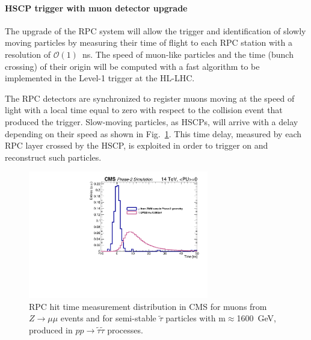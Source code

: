 \paragraph{HSCP trigger with muon detector upgrade}

The upgrade of the RPC system will allow the trigger and identification of slowly moving particles by measuring their time of flight to each RPC station with a resolution of $\mathcal{O}(1)$~ns. The speed of muon-like particles and the time (bunch crossing) of their origin will be computed with a fast algorithm to be implemented in the Level-1 trigger at the HL-LHC.

The RPC detectors are synchronized to register muons moving at the speed of light with a local time equal to zero with respect to the collision event that produced the trigger. Slow-moving particles, as HSCPs, will arrive with a delay depending on their speed as shown in Fig.~\ref{fig:hscp_time}. This time delay, measured by each RPC layer crossed by the HSCP, is exploited in order to trigger on and reconstruct such particles. 

\begin{figure}[t]
\begin{center}
  \includegraphics[width=0.7\textwidth]{figures/HSCP/time.pdf}
  \caption{RPC hit time measurement distribution in CMS for muons from $Z \to \mu\mu$ events and for semi-stable $\tilde \tau$ particles with m$\approx$1600~GeV, produced in $pp \to \tilde \tau \tilde \tau$ processes.}
  \label{fig:hscp_time}
\end{center}
\end{figure}

